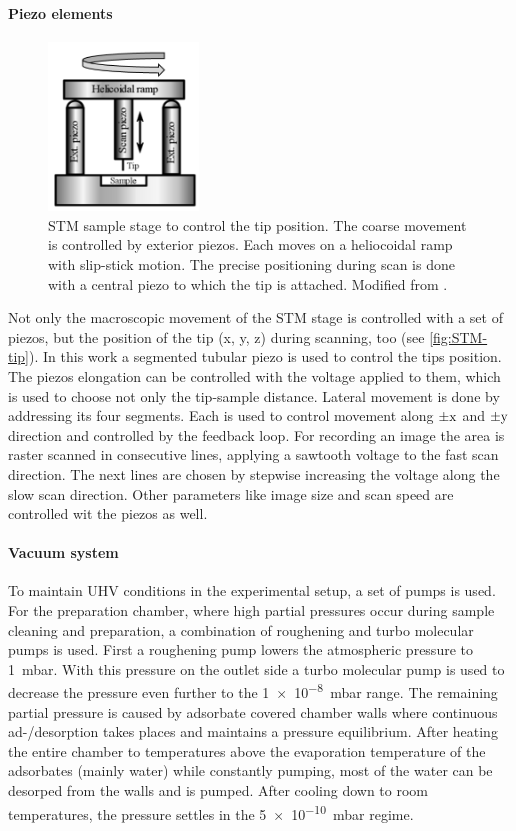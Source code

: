 \paragraph{Piezo elements}
\begin{figure} \centering
	\includegraphics[width=4cm]{./images/STM-sketch-2}
	\caption{STM sample stage to control the tip position. The coarse movement is controlled by exterior piezos. Each moves on a heliocoidal ramp with slip-stick motion. The precise positioning during scan is done with a central piezo to which the tip is attached. Modified from \cite{heliocoidal_ramp_2018}.}
	\label{fig:stm-heliocoidal ramp}
\end{figure}
Not only the macroscopic movement of the STM stage is controlled with a set of piezos, but the position of the tip (x, y, z) during scanning, too (see \autoref{fig:STM-tip}). In this work a segmented tubular piezo is used to control the tips position. The piezos elongation can be controlled with the voltage applied to them, which is used to choose not only the tip-sample distance. Lateral movement is done by addressing its four segments. Each is used to control movement along $\pm \textnormal{x}$ and $\pm \textnormal{y}$ direction and controlled by the feedback loop. For recording an image the area is raster scanned in consecutive lines, applying a sawtooth voltage to the fast scan direction. The next lines are chosen by stepwise increasing the voltage along the slow scan direction. Other parameters like image size and scan speed are controlled wit the piezos as well.

\paragraph{Vacuum system}
To maintain UHV conditions in the experimental setup, a set of pumps is used. For the preparation chamber, where high partial pressures occur during sample cleaning and preparation, a combination of roughening and turbo molecular pumps is used. First a roughening pump lowers the atmospheric pressure to \SI{1}{\milli \bar}. With this pressure on the outlet side a turbo molecular pump is used to decrease the pressure even further to the  \SI{1e-8}{\milli \bar} range. The remaining partial pressure is caused by adsorbate covered chamber walls where continuous ad-/desorption takes places and maintains a pressure equilibrium. After heating the entire chamber to temperatures above the evaporation temperature of the adsorbates (mainly water) while constantly pumping, most of the water can be desorped from the walls and is pumped. After cooling down to room temperatures, the pressure settles in the \SI{5e-10}{\milli \bar} regime.


